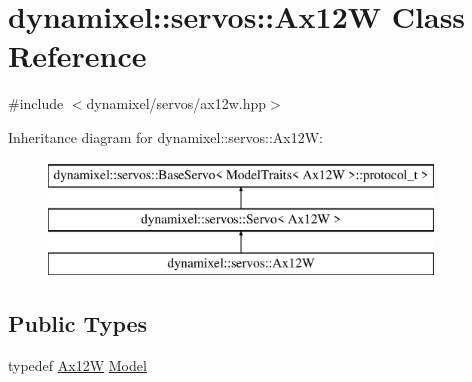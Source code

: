 \hypertarget{classdynamixel_1_1servos_1_1_ax12_w}{}\section{dynamixel\+:\+:servos\+:\+:Ax12\+W Class Reference}
\label{classdynamixel_1_1servos_1_1_ax12_w}


{\ttfamily \#include $<$dynamixel/servos/ax12w.\+hpp$>$}

Inheritance diagram for dynamixel\+:\+:servos\+:\+:Ax12\+W\+:\begin{figure}[H]
\begin{center}
\leavevmode
\includegraphics[height=3.000000cm]{classdynamixel_1_1servos_1_1_ax12_w}
\end{center}
\end{figure}
\subsection*{Public Types}
\begin{DoxyCompactItemize}
\item 
typedef \hyperlink{classdynamixel_1_1servos_1_1_ax12_w}{Ax12\+W} \hyperlink{classdynamixel_1_1servos_1_1_ax12_w_ae961bb0cca2e1de1382b97e7d8b41b54}{Model}
\end{DoxyCompactItemize}
